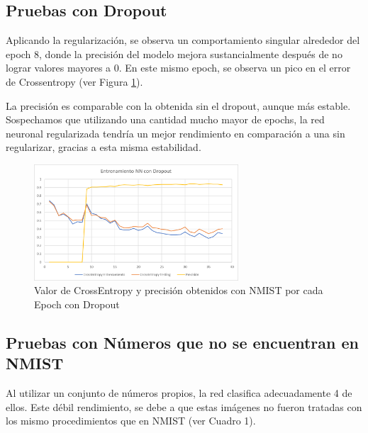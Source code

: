\documentclass[journal]{IEEEtran}
\begin{document}
\subsection{ Pruebas con Dropout}

Aplicando la regularización, se observa un comportamiento singular alrededor del epoch 8, donde la precisión del modelo mejora sustancialmente después de no lograr valores mayores a 0. En este mismo epoch, se observa un pico en el error de Crossentropy (ver Figura \ref{conDropout}).

La precisión es comparable con la obtenida sin el dropout, aunque más estable. Sospechamos que utilizando una cantidad mucho mayor de epochs, la red neuronal regularizada tendría un mejor rendimiento en comparación a una sin regularizar, gracias a esta misma estabilidad.

\begin{figure}[!t]
\centering
\includegraphics[width=3in]{conDropout.png}
\caption{Valor de CrossEntropy y precisión obtenidos con NMIST por cada Epoch con Dropout}
\label{conDropout}
\end{figure}

\subsection{ Pruebas con Números que no se encuentran en NMIST}

Al utilizar un conjunto de números propios, la red clasifica adecuadamente 4 de ellos. Este débil rendimiento, se debe a que estas imágenes no fueron tratadas con los mismo procedimientos que en NMIST (ver Cuadro 1).
\end{document}

